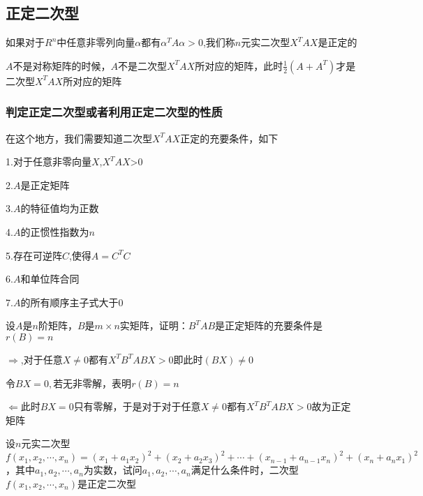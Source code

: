 \documentclass[lang=cn,10pt]{elegantbook}
\begin{document}
\subsection{正定二次型}
\begin{definition}
	如果对于$R^{n}$中任意非零列向量$\alpha$都有$\alpha^{T}A\alpha>0$,我们称$n$元实二次型$X^{T}AX$是正定的
\end{definition}
\begin{remark}
	
	$A$不是对称矩阵的时候，$A$不是二次型$X^{T}AX$所对应的矩阵，此时$\frac{1}{2}(A+A^{T})$才是二次型$X^{T}AX$所对应的矩阵
\end{remark}
\subsubsection{判定正定二次型或者利用正定二次型的性质}
在这个地方，我们需要知道二次型$X^{T}AX$正定的充要条件，如下
\begin{conclusion}
	
	1.对于任意非零向量$X$,$X^{T}AX$>0
	
	2.$A$是正定矩阵
	
	3.$A$的特征值均为正数
	
	4.$A$的正惯性指数为$n$
	
	5.存在可逆阵$C$,使得$A=C^{T}C$
	
	6.$A$和单位阵合同
	
	7.$A$的所有顺序主子式大于0
\end{conclusion}
\begin{example}
	设$A$是$n$阶矩阵，$B$是$m\times n$实矩阵，证明：$B^{T}AB$是正定矩阵的充要条件是$r(B)=n$
\end{example}
\begin{solution}
	
	$\Rightarrow$,对于任意$X\ne0$都有$X^{T}B^{T}ABX>0$即此时$(BX)\ne0$
	
	令$BX=0,$若无非零解，表明$r(B)=n$
	
	$\Leftarrow$此时$BX=0$只有零解，于是对于对于任意$X\ne0$都有$X^{T}B^{T}ABX>0$故为正定矩阵
\end{solution}
\begin{example}
	设$n$元实二次型$f(x_{1},x_{2},\cdots,x_{n})=(x_{1}+a_{1}x_{2})^{2}+(x_{2}+a_{2}x_{3})^{2}+\cdots+(x_{n-1}+a_{n-1}x_{n})^{2}+(x_{n}+a_{n}x_{1})^{2}$，其中$a_{1},a_{2},\cdots,a_{n}$为实数，试问$a_{1},a_{2},\cdots,a_{n}$满足什么条件时，二次型$f(x_{1},x_{2},\cdots,x_{n})$是正定二次型
\end{example}
\end{document}
